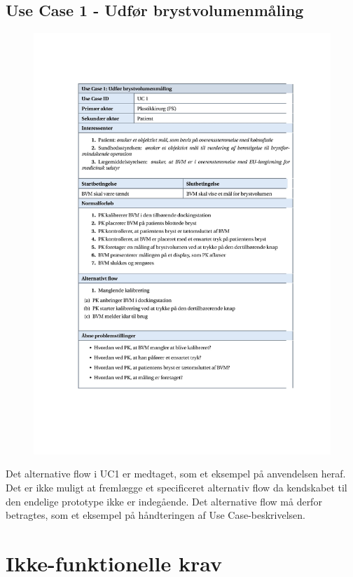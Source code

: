   		\subsection{Use Case 1 - Udfør brystvolumenmåling}
  			
  			\begin{figure}[htb]
  				\flushleft
  					\includegraphics[width=6in]{UCtabel1}
  			\end{figure}
  			
  			
Det alternative flow i UC1 er medtaget, som et eksempel på anvendelsen heraf. Det er ikke muligt at fremlægge et specificeret alternativ flow da kendskabet til den endelige prototype ikke er indegående.  Det alternative flow må derfor betragtes, som et eksempel på håndteringen af Use Case-beskrivelsen. 
	
	\section{Ikke-funktionelle krav}
	
